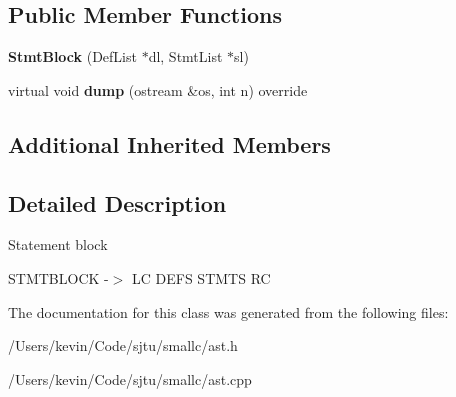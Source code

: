 \subsection*{Public Member Functions}
\begin{DoxyCompactItemize}
\item 
\mbox{\label{class_stmt_block_ae2de3b72f160c22ea471670ed543d94b}} 
{\bfseries Stmt\+Block} (Def\+List $\ast$dl, Stmt\+List $\ast$sl)
\item 
\mbox{\label{class_stmt_block_a0fa1df31741ba3e835bbc052f9814d62}} 
virtual void {\bfseries dump} (ostream \&os, int n) override
\end{DoxyCompactItemize}
\subsection*{Additional Inherited Members}


\subsection{Detailed Description}
Statement block

S\+T\+M\+T\+B\+L\+O\+CK -\/$>$ LC D\+E\+FS S\+T\+M\+TS RC 

The documentation for this class was generated from the following files\+:\begin{DoxyCompactItemize}
\item 
/\+Users/kevin/\+Code/sjtu/smallc/ast.\+h\item 
/\+Users/kevin/\+Code/sjtu/smallc/ast.\+cpp\end{DoxyCompactItemize}
